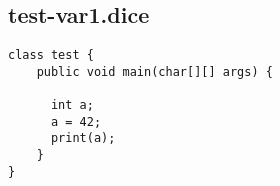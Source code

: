 \subsection{test-var1.dice}
\begin{verbatim}
class test {
	public void main(char[][] args) {

	  int a;
	  a = 42;
	  print(a);
	}
}

\end{verbatim}